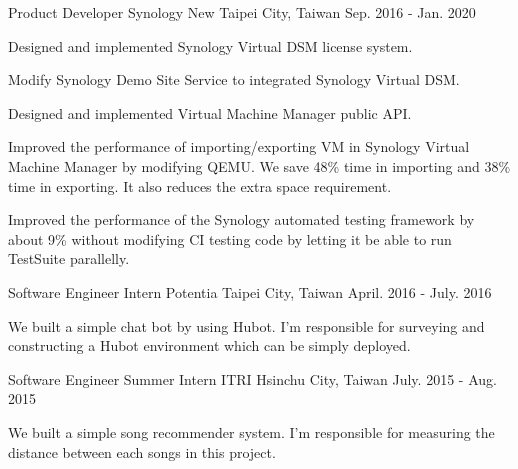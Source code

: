\begin{cventries}
  \cventry
    {Product Developer} %
    {Synology} %
    {New Taipei City, Taiwan} %
    {Sep. 2016 - Jan. 2020} %
    {
      \begin{cvitems} %
        \item {Designed and implemented Synology Virtual DSM license system.}
        \item {Modify Synology Demo Site Service to integrated Synology Virtual DSM.}
        \item {Designed and implemented Virtual Machine Manager public API.}
        \item {Improved the performance of importing/exporting VM in Synology Virtual Machine Manager by modifying QEMU. We save 48\% time in importing and 38\% time in exporting. It also reduces the extra space requirement.}
        \item {Improved the performance of the Synology automated testing framework by about 9\% without modifying CI testing code by letting it be able to run TestSuite parallelly.}
      \end{cvitems}
    }

  \cventry
    {Software Engineer Intern} %
    {Potentia} %
    {Taipei City, Taiwan} %
    {April. 2016 - July. 2016} %
    {
      \begin{cvitems} %
        \item {We built a simple chat bot by using Hubot. I'm responsible for surveying and constructing a Hubot environment which can be simply deployed.}
      \end{cvitems}
    }

  \cventry
    {Software Engineer Summer Intern} %
    {ITRI} %
    {Hsinchu City, Taiwan} %
    {July. 2015 - Aug. 2015} %
    {
      \begin{cvitems} %
        \item {We built a simple song recommender system. I'm responsible for measuring the distance between each songs in this project.}
      \end{cvitems}
    }
\end{cventries}
